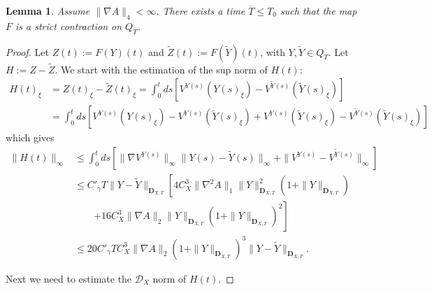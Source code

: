 \documentclass[a4paper,12pt,reqno]{amsart}
\newcommand{\wt}{\widetilde}
\newcommand{\norm}[1]{\|#1\|}
\newtheorem{lemma}{Lemma}
\newcommand{\DXT}{\mathbf{D}_{X,T}}
\newcommand{\DX}{\mathscr{D}_{X}}
\begin{document}
\begin{lemma}
\label{lemma:uniqueness-rough}
 Assume $\|\nabla A\|_4 < \infty$.
There exists a time $\overline{T} \le T_0$ such that the
map $F$ is a strict contraction on $Q_{\overline{T}}$.
\end{lemma}
\begin{proof}
Let $Z(t) := F(Y)(t)$
and $\wt Z (t) := F(\wt Y)(t)$, with $Y, \wt Y \in Q_{T}$.
Let $H := Z - \wt Z$.%
We start with the estimation of the sup norm of $H(t)$:
\begin{equation*}
  \begin{split}
 H(t)_\xi & =   Z(t)_\xi-\wt Z(t)_\xi   = \int_0^t ds \left[
V^{Y(s)}(Y(s)_\xi) - V^{\wt Y(s)}(\wt Y(s)_\xi)
\right]
\\ & =
\int_0^t ds \left[
V^{Y(s)}(Y(s)_\xi)- V^{Y(s)}(\wt Y(s)_\xi) + V^{Y(s)}(\wt Y(s)_\xi) - V^{\wt Y(s)}(\wt Y(s)_\xi)
\right]
  \end{split}
\end{equation*}
which gives
\begin{equation}
\label{eq:bound-h0}
  \begin{split}
 \norm{H(t)}_\infty & \le \int_0^t ds \left [\norm{\nabla V^{Y(s)}}_\infty
 \norm{Y(s)-\wt Y(s)}_\infty  + \norm{V^{Y(s)}-V^{\wt Y(s)}}_\infty
 \right]
\\ & \le C'_\gamma T \norm{Y-\wt Y}_{\DXT} \left[4 C_X^3 \norm{\nabla^2 A}_1
 \norm{Y}_{\DXT}^2 (1+\norm{Y}_{\DXT})
 \right. \\
& \qquad  \left. + 16 C_X^3 \norm{\nabla A}_2
 \norm{Y}_{\DXT} (1+\norm{Y}_{\DXT})^2 \right]
\\ & \le 20 C'_\gamma T C_X^3 \norm{\nabla A}_2 (1+\norm{Y}_{\DXT})^3 \norm{Y-\wt Y}_{\DXT}.
  \end{split}
\end{equation}

Next we need to estimate the $\DX$ norm of $H(t)$. 


\end{proof}
\end{document}
